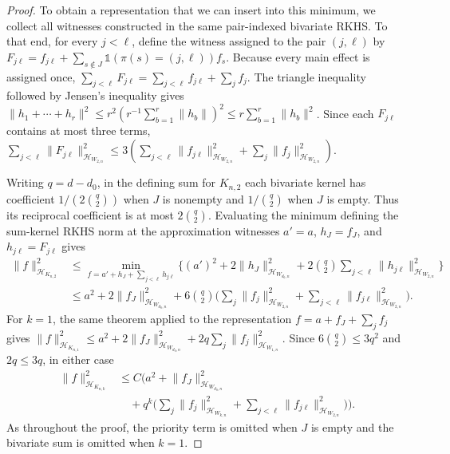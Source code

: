 \documentclass[letterpaper,12pt]{article}
\theoremstyle{definition}
\numberwithin{equation}{section}
\newcommand{\mc}{\mathcal}
\newcommand{\one}{\mathds{1}}
\newcommand{\norm}[1]{\lVert#1\rVert}
\begin{document}
\begin{proof}
To obtain a representation that we can insert into this minimum, we collect all witnesses constructed in the same pair-indexed bivariate RKHS.
To that end, for every $j<\ell$, define the witness assigned to the pair $(j,\ell)$ by $F_{j\ell}=f_{j\ell}+\sum_{s\notin J}\one(\pi(s)=(j,\ell))f_s$.
Because every main effect is assigned once, $\sum_{j<\ell}F_{j\ell}=\sum_{j<\ell}f_{j\ell}+\sum_jf_j$.
The triangle inequality followed by Jensen's inequality gives $\norm{h_1+\cdots+h_r}^2\leq r^2(r^{-1}\sum_{b=1}^r\norm{h_b})^2\leq r\sum_{b=1}^r\norm{h_b}^2$.
Since each $F_{j\ell}$ contains at most three terms, $\sum_{j<\ell}\norm{F_{j\ell}}_{\mc H_{W_{2,n}}}^2\leq3(\sum_{j<\ell}\norm{f_{j\ell}}_{\mc H_{W_{2,n}}}^2+\sum_j\norm{f_j}_{\mc H_{W_{2,n}}}^2)$.

Writing $q=d-d_0$, in the defining sum for $K_{n,2}$ each bivariate kernel has coefficient $1/(2\binom q2)$ when $J$ is nonempty and $1/\binom q2$ when $J$ is empty.
Thus its reciprocal coefficient is at most $2\binom q2$.
Evaluating the minimum defining the sum-kernel RKHS norm at the approximation witnesses $a'=a$, $h_J=f_J$, and $h_{j\ell}=F_{j\ell}$ gives
\begin{equation*}
\begin{aligned}
\norm{f}_{\mc H_{K_{n,2}}}^2&\leq\min_{f=a'+h_J+\sum_{j<\ell}h_{j\ell}}\bigg\{(a')^2+2\norm{h_J}_{\mc H_{W_{d_0,n}}}^2+2\binom q2\sum_{j<\ell}\norm{h_{j\ell}}_{\mc H_{W_{2,n}}}^2\bigg\}\\
&\leq a^2+2\norm{f_J}_{\mc H_{W_{d_0,n}}}^2+6\binom q2\bigg(\sum_j\norm{f_j}_{\mc H_{W_{2,n}}}^2+\sum_{j<\ell}\norm{f_{j\ell}}_{\mc H_{W_{2,n}}}^2\bigg).
\end{aligned}
\end{equation*}
For $k=1$, the same theorem applied to the representation $f=a+f_J+\sum_jf_j$ gives $\norm{f}_{\mc H_{K_{n,1}}}^2\leq a^2+2\norm{f_J}_{\mc H_{W_{d_0,n}}}^2+2q\sum_j\norm{f_j}_{\mc H_{W_{1,n}}}^2$.
Since $6\binom q2\leq3q^2$ and $2q\leq3q$, in either case
\begin{equation}\label{equation:proof-low-order-quotient-norm}
\begin{aligned}
\norm{f}_{\mc H_{K_{n,k}}}^2&\leq C\bigg(a^2+\norm{f_J}_{\mc H_{W_{d_0,n}}}^2\\
&\quad+q^k\bigg(\sum_j\norm{f_j}_{\mc H_{W_{k,n}}}^2+\sum_{j<\ell}\norm{f_{j\ell}}_{\mc H_{W_{2,n}}}^2\bigg)\bigg).
\end{aligned}
\end{equation}
As throughout the proof, the priority term is omitted when $J$ is empty and the bivariate sum is omitted when $k=1$.

\end{proof}
\end{document}
